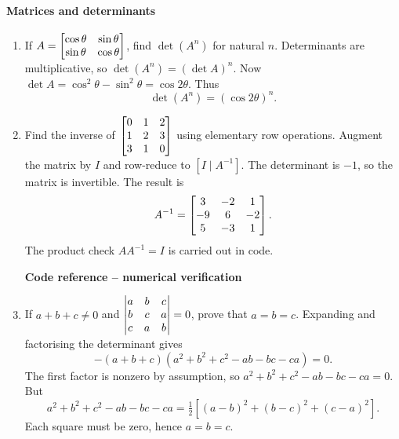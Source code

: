 \paragraph*{Matrices and determinants}
\begin{enumerate}[label={},leftmargin=0pt,itemsep=9pt]
\item[\textbf{1.2.28}] If $A=\begin{bmatrix}\cos\theta&\sin\theta\\\sin\theta&\cos\theta\end{bmatrix}$, find $\det(A^n)$ for natural $n$.
\solution Determinants are multiplicative, so $\det(A^n)=(\det A)^n$. Now $\det A=\cos^2\theta-\sin^2\theta=\cos2\theta$. Thus
\[
\det(A^n)=(\cos2\theta)^n.
\]

\item[\textbf{1.2.30}] Find the inverse of $\begin{bmatrix}0&1&2\\1&2&3\\3&1&0\end{bmatrix}$ using elementary row operations.
\solution Augment the matrix by $I$ and row-reduce to $[I\mid A^{-1}]$. The determinant is $-1$, so the matrix is invertible. The result is
\[
A^{-1}=\begin{bmatrix}3&-2&1\\-9&6&-2\\5&-3&1\end{bmatrix}.
\]
The product check $AA^{-1}=I$ is carried out in code.
\par\smallskip
\noindent\textbf{Code reference -- numerical verification}
\par\noindent{}
\par\smallskip

\item[\textbf{1.2.36}] If $a+b+c\ne0$ and $\begin{vmatrix}a&b&c\\b&c&a\\c&a&b\end{vmatrix}=0$, prove that $a=b=c$.
\solution Expanding and factorising the determinant gives
\[
-(a+b+c)(a^2+b^2+c^2-ab-bc-ca)=0.
\]
The first factor is nonzero by assumption, so $a^2+b^2+c^2-ab-bc-ca=0$. But
\[
a^2+b^2+c^2-ab-bc-ca=\tfrac12[(a-b)^2+(b-c)^2+(c-a)^2].
\]
Each square must be zero, hence $a=b=c$.


\end{enumerate}
